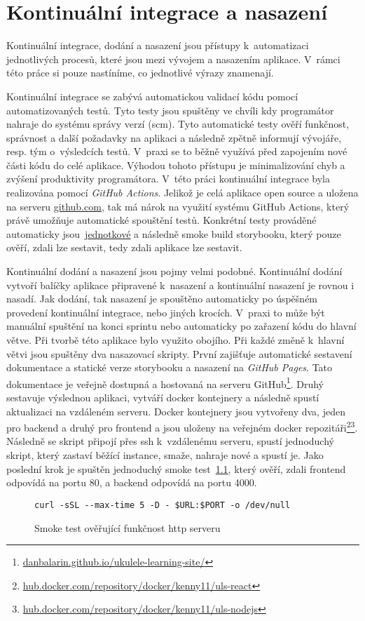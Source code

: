 \chapter{Kontinuální integrace a nasazení}
\label{ch:ci_cd}
Kontinuální integrace, dodání a nasazení jsou přístupy k~automatizaci jednotlivých procesů, které jsou mezi vývojem a nasazením aplikace. V~rámci této práce si pouze nastíníme, co jednotlivé výrazy znamenají.

Kontinuální integrace se zabývá automatickou validací kódu pomocí automatizovaných testů. Tyto testy jsou spuštěny ve chvíli kdy programátor nahraje do systému správy verzí (\acrshort{scm}). Tyto automatické testy ověří funkčnost, správnost a další požadavky na aplikaci a následně zpětně informují vývojáře, resp. tým o~výsledcích testů. V~praxi se to běžně využívá před zapojením nové části kódu do celé aplikace. Výhodou tohoto přístupu je minimalizování chyb a zvýšení produktivity programátora. V~této práci kontinuální integrace byla realizována pomocí \emph{GitHub Actions}. Jelikož je celá aplikace open source a uložena na serveru \href{www.github.com}{github.com}, tak má nárok na využití systému GitHub Actions, který právě umožňuje automatické spouštění testů. Konkrétní testy prováděné automaticky jsou~\hyperref[sc:unit_tests]{jednotkové} a následně smoke build storybooku, který pouze ověří, zdali lze sestavit, tedy zdali aplikace lze sestavit. \cite[s.~7]{rossel_2017_continuous}

Kontinuální dodání a nasazení jsou pojmy velmi podobné. Kontinuální dodání vytvoří balíčky aplikace připravené k~nasazení a kontinuální nasazení je rovnou i nasadí. Jak dodání, tak nasazení je spouštěno automaticky po úspěšném provedení kontinuální integrace, nebo jiných krocích. V~praxi to může být manuální spuštění na konci sprintu nebo automaticky po zařazení kódu do hlavní větve. \cite[s.~18]{rossel_2017_continuous} Při tvorbě této aplikace bylo využito obojího. Při každé změně k~hlavní větvi jsou spuštěny dva nasazovací skripty. První zajišťuje automatické sestavení dokumentace a statické verze storybooku a nasazení na \emph{GitHub Pages}. Tato dokumentace je veřejně dostupná a hostovaná na serveru GitHub\footnote{\href{https://danbalarin.github.io/ukulele-learning-site/}{danbalarin.github.io/ukulele-learning-site/}}. Druhý sestavuje výslednou aplikaci, vytváří docker kontejnery a následně spustí aktualizaci na vzdáleném serveru. Docker kontejnery jsou vytvořeny dva, jeden pro backend a druhý pro frontend a jsou uloženy na veřejném docker repozitáři\footnote{\href{https://hub.docker.com/repository/docker/kenny11/uls-react}{hub.docker.com/repository/docker/kenny11/uls-react}}\footnote{\href{https://hub.docker.com/repository/docker/kenny11/uls-nodejs}{hub.docker.com/repository/docker/kenny11/uls-nodejs}}. Následně se skript připojí přes ssh k~vzdálenému serveru, spustí jednoduchý skript, který zastaví běžící instance, smaže, nahraje nové a spustí je. Jako poslední krok je spuštěn jednoduchý smoke test~\ref{code:smoke}, který ověří, zdali frontend odpovídá na portu 80, a backend odpovídá na portu 4000.

\begin{figure}[h!]
    \centering
    \begin{verbatim}
curl -sSL --max-time 5 -D - $URL:$PORT -o /dev/null
    \end{verbatim}
    \caption{Smoke test ověřující funkčnost http serveru}
    \label{code:smoke}
\end{figure}
